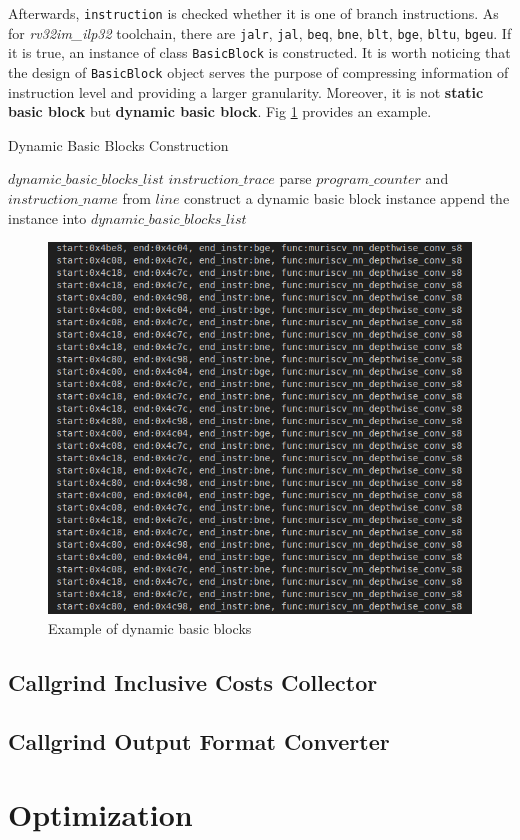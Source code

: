 Afterwards, \texttt{instruction} is checked whether it is one of branch instructions. As for \textit{rv32im\_ilp32} toolchain, there are \texttt{jalr}, \texttt{jal}, \texttt{beq}, \texttt{bne}, \texttt{blt}, \texttt{bge}, \texttt{bltu}, \texttt{bgeu}. If it is true, an instance of class \texttt{BasicBlock} is constructed. It is worth noticing that the design of  \texttt{BasicBlock} object serves the purpose of compressing information of instruction level and providing a larger granularity. Moreover, it is not \textbf{static basic block} but \textbf{dynamic basic block}. Fig \ref{fig:basic_block} provides an example. 

\medskip
\begin{algorithm}
\caption{Dynamic Basic Blocks Construction}
\label{alg:dynamic_basic_blocks}
\begin{algorithmic}
\REQUIRE $dynamic\_basic\_blocks\_list$
\REQUIRE $instruction\_trace$
    \STATE parse $program\_counter$ and $instruction\_name$ from $line$ 
        \STATE construct a dynamic basic block instance
        \STATE append the instance into $dynamic\_basic\_blocks\_list$
    \ENDIF
\ENDFOR
\end{algorithmic}
\end{algorithm}
\medskip

\begin{figure}
    \centering
    \includegraphics[width=\linewidth]{figures/Basic_Block.png}
    \caption{Example of dynamic basic blocks}
    \label{fig:basic_block}
\end{figure}

\subsection{Callgrind Inclusive Costs Collector}
                    
\subsection{Callgrind Output Format Converter}
\label{subsec:converter}

\section{Optimization}